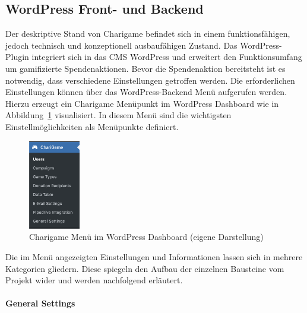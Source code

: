 \subsection{WordPress Front- und Backend}
\label{subsec:front-backend}
Der deskriptive Stand von Charigame befindet sich in einem funktionsfähigen, jedoch technisch und konzeptionell ausbaufähigen Zustand.
Das WordPress-Plugin integriert sich in das CMS WordPress und erweitert den Funktionsumfang um gamifizierte Spendenaktionen.
Bevor die Spendenaktion bereitsteht ist es notwendig, dass verschiedene Einstellungen getroffen werden.
Die erforderlichen Einstellungen können über das WordPress-Backend Menü aufgerufen werden.
\\
Hierzu erzeugt ein Charigame Menüpunkt im WordPress Dashboard wie in Abbildung~\ref{fig:charigame-menu-legacy} visualisiert.
In diesem Menü sind die wichtigsten Einstellmöglichkeiten als Menüpunkte definiert.
\begin{figure}[tbh]
    \centering
    \includegraphics[width=0.2\textwidth]{images/legacy_charigame_wordpress_menu}
    \caption{Charigame Menü im WordPress Dashboard (eigene Darstellung)}
    \label{fig:charigame-menu-legacy}
\end{figure}

Die im Menü angezeigten Einstellungen und Informationen lassen sich in mehrere Kategorien gliedern.
Diese spiegeln den Aufbau der einzelnen Bausteine vom Projekt wider und werden nachfolgend erläutert.
\\\\
\textbf{General Settings}

